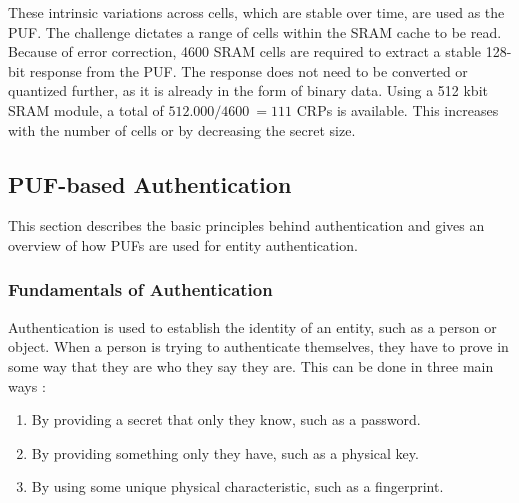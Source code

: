 These intrinsic variations across cells, which are stable over time, are used as the PUF.
The challenge dictates a range of cells within the SRAM cache to be read.
Because of error correction, 4600 SRAM cells are required to extract a stable 128-bit response from the PUF.
The response does not need to be converted or quantized further, as it is already in the form of binary data.
Using a 512 kbit SRAM module, a total of $512.000 / 4600 ~= 111$ \acp{CRP} is available.
This increases with the number of cells or by decreasing the secret size. \cite[][p. 73]{Guajardo}





\subsection{PUF-based Authentication}
\label{sec:puf_authentication}

This section describes the basic principles behind authentication and gives an overview of how PUFs
are used for entity authentication.

\subsubsection{Fundamentals of Authentication}

Authentication is used to establish the identity of an entity, such as a person or object.
When a person is trying to authenticate themselves, they have to prove in some way that they are
who they say they are. This can be done in three main ways \cite[][p.398]{Basavala2012}:

\begin{enumerate}
    \item By providing a secret that only they know, such as a password.
    \item By providing something only they have, such as a physical key.
    \item By using some unique physical characteristic, such as a fingerprint.
\end{enumerate}

